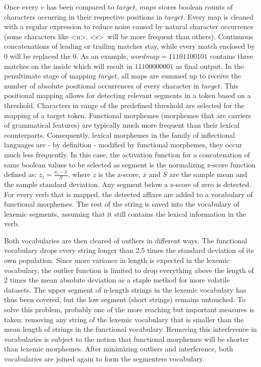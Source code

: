 Once every $v$ has been compared to $target$, $maps$ stores boolean counts of characters occurring in their respective positions in $target$.
Every map is cleaned with a regular expression to reduce noise caused by natural character occurrence (some characters like \textless n\textgreater, \textless s\textgreater ~will be more frequent than others).
Continuous concatenations of leading or trailing matches stay, while every match enclosed by $0$ will be replaced the $0$.
As an example, $wordmap = 11101100101$ contains three matches on the inside which will result in $11100000001$ as final output.
In the penultimate stage of mapping $target$, all maps are summed up to receive the number of absolute positional occurrences of every character in $target$.
This positional mapping allows for detecting relevant segments in a token based on a threshold.
Characters in range of the predefined threshold are selected for the mapping of a target token.
Functional morphemes (morphemes that are carriers of grammatical features) are typically much more frequent than their lexical counterparts.
Consequently, lexical morphemes in the family of inflectional languages are - by definition - modified by functional morphemes, they occur much less frequently.
In this case, the activation function for a concatenation of same boolean values to be selected as segment is the normalizing z-score function defined as: $z_{i} = \frac{x_{i} - \overline{x}}{S}$,
where $z$ is the z-score, $\overline{x}$ and $S$ are the sample mean and the sample standard deviation.
Any segment below a z-score of zero is detected.
For every verb that is mapped, the detected affixes are added to a vocabulary of functional morphemes.
The rest of the string is saved into the vocabulary of lexemic segments, assuming that it still contains the lexical information in the verb.

Both vocabularies are then cleared of outliers in different ways.
The functional vocabulary drops every string longer than 2.5 times the standard deviation of its own population.
Since more variance in length is expected in the lexemic vocabulary, the outlier function is limited to drop everything above the length  of 2 times the mean absolute deviation as a staple method for more volatile datasets.
The upper segment of n-length strings in the lexemic vocabulary has thus been covered, but the low segment (short strings) remains untouched.
To solve this problem, probably one of the more reaching but important measures is taken: removing any string of the lexemic vocabulary that is smaller than the mean length of strings in the functional vocabulary.
Removing this interference in vocabularies is subject to the notion that functional morphemes will be shorter than lexemic morphemes.
After minimizing outliers and interference, both vocabularies are joined again to form the segmenters vocabulary.

